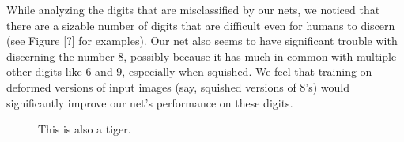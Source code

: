 \documentclass[10pt,twocolumn,letterpaper]{article}
\begin{document}
While analyzing the digits that are misclassified by our nets, we noticed that there are a sizable number of
digits that are difficult even for humans to discern (see Figure [?] for examples). Our net also seems to have
significant trouble with discerning the number 8, possibly because it has much in common with multiple other
digits like 6 and 9, especially when squished. We feel that training on deformed versions of input images
(say, squished versions of 8's) would significantly improve our net's performance on these digits.

\begin{figure}
  \caption{This is also a tiger.}
  \label{fig:actfilts}
\end{figure}

{\small


}
\end{document}
